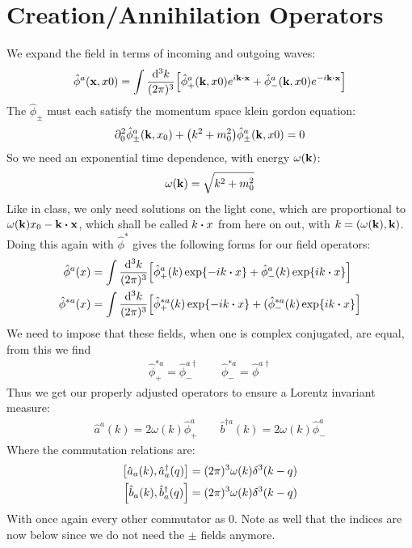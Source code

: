 \documentclass[12pt]{article}
\newcommand{\D}{\partial}
\newcommand{\phih}{\hat{\phi}}
\newcommand{\phish}{\hat{\phi}^*}
\newcommand{\ahat}{\hat{a}}
\newcommand{\ahatd}{\hat{a}^\dag}
\newcommand{\bhat}{\hat{b}}
\newcommand{\bhatd}{\hat{b}^\dag}
\begin{document}
\section{Creation/Annihilation Operators}
We expand the field in terms of incoming and outgoing waves:
\begin{align*}
  \phih^a(\vb{x},x0)=\int\frac{\dd[3]{k}}{(2\pi)^3}
  \qty[\phih_+^a(\vb{k},x0)e^{i\vb{k}\vdot\vb{x}}+
  \phih_-^a(\vb{k},x0)e^{-i\vb{k}\vdot\vb{x}}]
\end{align*}
The $\phih_\pm$ must each satisfy the momentum space klein gordon equation:
\begin{align*}
  \D_0^2\phih^a_\pm(\vb{k},x_0)+\qty(k^2+m_0^2)\phih^a_\pm(\vb{k},x0)=0
\end{align*}
So we need an exponential time dependence, with energy $\omega(\vb{k})$:
\begin{align*}
  \omega(\vb{k})=\sqrt{k^2+m^2_0}
\end{align*}
Like in class, we only need solutions on the light cone, which are proportional to $\omega(\vb{k})x_0-\vb{k}\vdot\vb{x}$, which shall be called $k\vdot x$ from here on out, with $k=(\omega(\vb{k}),\vb{k})$. Doing this again with $\phish$ gives the following forms for our field operators:
\begin{align*}
  \phih^a(x)&=\int\frac{\dd[3]{k}}{(2\pi)^3}
  \qty[\phih_+^a(k)\exp{-ik\vdot x}+\phih^a_-(k)\exp{ik\vdot x}]\\
  \phih^{*a}(x)&=\int\frac{\dd[3]{k}}{(2\pi)^3}
  \qty[\phih^{*a}_+(k)\exp{-ik\vdot x}+(\phih^{*a}_-(k)\exp{ik\vdot x}]
\end{align*}
We need to impose that these fields, when one is complex conjugated, are equal, from this we find
\begin{align*}
  \phih^{*a}_+=\phih^{a\dag}_-\qquad\phih^{*a}_-=\phih^{a\dag}
\end{align*}
Thus we get our properly adjusted operators to ensure a Lorentz invariant measure:
\begin{align*}
  \ahat^a(k)=2\omega(k)\phih^a_+\qquad\bhat^{\dag a}(k)=2\omega(k)\phih^a_-
\end{align*}
Where the commutation relations are:
\begin{align*}
  \comm{\ahat_a(k)}{\ahatd_a(q)}&=(2\pi)^3\omega(k)\delta^3(k-q)\\
  \comm{\bhat_a(k)}{\bhatd_a(q)}&=(2\pi)^3\omega(k)\delta^3(k-q)
\end{align*}
With once again every other commutator as 0. Note as well that the indices are now below since we do not need the $\pm$ fields anymore.
\end{document}
